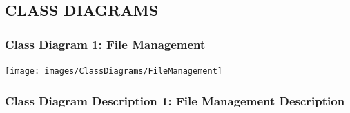 \documentclass[twoside,letterpaper]{article}
\begin{document}
\subsection[Class Diagrams]{\rmfamily\bfseries\color{black} CLASS DIAGRAMS}
\hypertarget{RefHeading21659017292}{}{\color{black}

\subsubsection[Class Diagram 1: File Management]{\rmfamily\bfseries\color{black}
	Class Diagram 1: File Management}
\hypertarget{RefHeading22059017292}{}
\bigskip

\texttt{[image: images/ClassDiagrams/FileManagement]}

\newpage

\subsubsection[Class Diagram Description 1: File Management Description]{\rmfamily\bfseries\color{black}
	Class Diagram Description 1: File Management Description}
\hypertarget{RefHeading22059017292}{}

}
\end{document}
